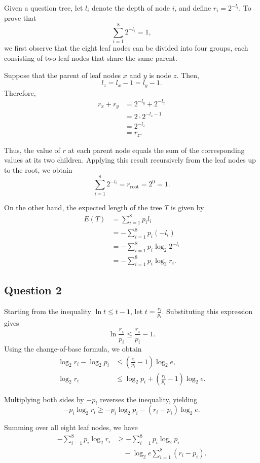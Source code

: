 \documentclass[10pt,a4paper]{article}
\begin{document}
	Given a question tree, let \(l_i\) denote the depth of node \(i\), and define \(r_i = 2^{-l_i}\). To prove that
	\[
	\sum_{i=1}^{8} 2^{-l_i} = 1,
	\]
	we first observe that the eight leaf nodes can be divided into four groups, each consisting of two leaf nodes that share the same parent.
	
	Suppose that the parent of leaf nodes \(x\) and \(y\) is node \(z\). Then,
	\[
	l_z = l_x - 1 = l_y - 1.
	\]
	Therefore,
	\[
	\begin{aligned}
		r_x + r_y
		&= 2^{-l_y} + 2^{-l_x} \\
		&= 2 \cdot 2^{-l_z-1} \\
		&= 2^{-l_z} \\
		&= r_z.
	\end{aligned}
	\]
	
	Thus, the value of \(r\) at each parent node equals the sum of the corresponding values at its two children. Applying this result recursively from the leaf nodes up to the root, we obtain
	\[
	\sum_{i=1}^{8} 2^{-l_i}
	= r_{\mathrm{root}}
	= 2^0
	= 1.
	\]
	
	On the other hand, the expected length of the tree \(T\) is given by
	\[
	\begin{aligned}
		E(T)
		&= \sum_{i=1}^{8} p_i l_i \\
		&= -\sum_{i=1}^{8} p_i(-l_i) \\
		&= -\sum_{i=1}^{8} p_i \log_2 2^{-l_i} \\
		&= -\sum_{i=1}^{8} p_i \log_2 r_i.
	\end{aligned}
	\]
	
	\subsection{Question 2}
	
	Starting from the inequality $\ln t \leq t-1$, let
	$t = \frac{r_i}{p_i}$. Substituting this expression gives
	\[
	\ln \frac{r_i}{p_i}
	\leq \frac{r_i}{p_i}-1.
	\]
	Using the change-of-base formula, we obtain
	\begin{align*}
		\log_2 r_i - \log_2 p_i
		&\leq \left(\frac{r_i}{p_i}-1\right)\log_2 e,\\
		\log_2 r_i
		&\leq \log_2 p_i
		+ \left(\frac{r_i}{p_i}-1\right)\log_2 e.
	\end{align*}
	
	Multiplying both sides by $-p_i$ reverses the
	inequality, yielding
	\[
	-p_i\log_2 r_i
	\geq -p_i\log_2 p_i
	-(r_i-p_i)\log_2 e.
	\]
	
	Summing over all eight leaf nodes, we have
	\begin{align*}
		-\sum_{i=1}^{8}p_i\log_2 r_i
		&\geq -\sum_{i=1}^{8}p_i\log_2 p_i\\
		&\quad -\log_2 e\sum_{i=1}^{8}(r_i-p_i).
	\end{align*}
	
\end{document}
